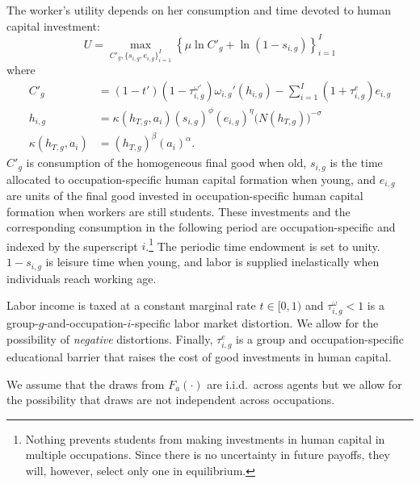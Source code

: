 \documentclass[onehalfspacing,11pt]{article}
\begin{document}
The worker's utility depends on her consumption and time devoted to human capital investment:
\begin{equation}
U = \max_{C'_{g},\{s_{i,g},e_{i,g}\}_{i=1}^I} \left\{\mu \ln C'_{g} + \ln\left(1-s_{i,g} \right) \label{eq:util} \right\}_{i=1}^I
\end{equation}
where
\begin{align}
\label{}
C'_{g} & =(1-t')(1-\tau^{\omega '}_{i,g})\omega_{i,g}'(h_{i,g})- \sum_{i=1}^I(1+\tau^e_{i,g})e_{i,g} \label{eq:bc}\\ %
h_{i,g} & =\kappa(h_{T,g},a_i)(s_{i,g})^{\phi} (e_{i,g})^{\eta}\big(N(h_{T,g})\big)^{-\sigma} \label{eq:h}\\
\kappa(h_{T,g},a_i) & =(h_{T,g})^\beta \left(a_i \right)^\alpha. \label{eq:g(h,a)}
\end{align}
$C'_{g}$ is consumption of the homogeneous final good when old, $s_{i,g}$ is the time allocated to occupation-specific human capital formation when young, and $e_{i,g}$ are units of the final good invested in occupation-specific human capital formation when workers are still students. These investments and the corresponding consumption in the following period are occupation-specific and indexed by the superscript $i$.\footnote{Nothing prevents students from making investments in human capital in multiple occupations. Since there is no uncertainty in future payoffs, they will, however, select only one in equilibrium.} The periodic time endowment is set to unity. $1-s_{i,g}$ is leisure time when young, and labor is supplied inelastically when individuals reach working age.

Labor income is taxed at a constant marginal rate $t \in [0,1)$ and $\tau^\omega_{i,g} < 1$ is a group-$g$-and-occupation-$i$-specific labor market distortion. We allow for the possibility of {\it negative} distortions. Finally, $\tau^e_{i,g}$ is a group and occupation-specific educational barrier that raises the cost of good investments in human capital.


We assume that the draws from $F_a \left( \cdot \right)$ are i.i.d.~across agents but we allow for the possibility that draws are not independent across occupations.
\end{document}
